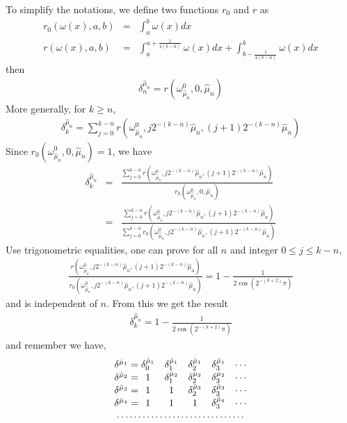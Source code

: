\documentclass{article}
\begin{document}
To simplify the notations, we define two functions $r_0$ and $r$ as
\begin{eqnarray}
  r_0(\omega(x),a,b) &=&  \int_a^b \omega(x) dx\\
  r(\omega(x),a,b)   &=&  \int_a^{a+\frac{1}{4(b-a)}} \omega(x) dx + \int_{b-\frac{1}{4(b-a)}}^b \omega(x) dx
\end{eqnarray}
then 
\begin{eqnarray}
  \delta_n^{\hat{\mu}_n} = r(\omega_{\hat{\mu}_n}^0,0,\hat{\mu}_n)
\end{eqnarray}
More generally, for $k \ge n$, 
\begin{eqnarray}
  \delta_k^{\hat{\mu}_n} = \sum_{j=0}^{k-n} r(\omega_{\hat{\mu}_n}^0,j 2^{-(k-n)} \hat{\mu}_n,(j+1) 2^{-(k-n)} \hat{\mu}_n)
\end{eqnarray}
Since $r_0(\omega_{\hat{\mu}_n}^0,0,\hat{\mu}_n)=1$, we have
\begin{eqnarray}
  \delta_k^{\hat{\mu}_n} &=& \frac{\sum_{j=0}^{k-n} r(\omega_{\hat{\mu}_n}^0,j 2^{-(k-n)} \hat{\mu}_n,(j+1) 2^{-(k-n)} \hat{\mu}_n)}
                                {r_0(\omega_{\hat{\mu}_n}^0,0,\hat{\mu}_n)} \nonumber  \\
                         &=& \frac{\sum_{j=0}^{k-n} r(\omega_{\hat{\mu}_n}^0,j 2^{-(k-n)} \hat{\mu}_n,(j+1) 2^{-(k-n)} \hat{\mu}_n)}
                                  {\sum_{j=0}^{k-n} r_0(\omega_{\hat{\mu}_n}^0,j 2^{-(k-n)} \hat{\mu}_n,(j+1) 2^{-(k-n)} \hat{\mu}_n)} 
\end{eqnarray}
Use trigonometric equalities, one can prove for all $n$ and integer $0 \le j \le k-n $,
\begin{eqnarray}
              \frac{r(\omega_{\hat{\mu}_n}^0,j 2^{-(k-n)} \hat{\mu}_n,(j+1) 2^{-(k-n)} \hat{\mu}_n)}
                   {r_0(\omega_{\hat{\mu}_n}^0,j 2^{-(k-n)} \hat{\mu}_n,(j+1) 2^{-(k-n)} \hat{\mu}_n)} =
              1-\frac{1}{2\cos(2^{-(k+2)} \pi)}
\end{eqnarray}
and is independent of $n$. From this we get the result 
\begin{eqnarray}
\label{deltashiftequality}
 \delta_{k}^{\hat{\mu}_{n}} =  1-\frac{1}{2\cos(2^{-(k+2)} \pi)}
\end{eqnarray}
and remember we have,
\begin{eqnarray}
\begin{array}{c@{{}={}}ccccc} 
 \delta^{\hat{\mu}_1} & \delta_{0}^{\hat{\mu}_1} & \delta_{1}^{\hat{\mu}_1} & \delta_{2}^{\hat{\mu}_1}& \delta_{3}^{\hat{\mu}_1}&\cdots   \\
 \delta^{\hat{\mu}_2} & 1                        & \delta_{1}^{\hat{\mu}_2} & \delta_{2}^{\hat{\mu}_2}& \delta_{3}^{\hat{\mu}_2}&\cdots   \\
 \delta^{\hat{\mu}_3} & 1                        & 1                        & \delta_{2}^{\hat{\mu}_3}& \delta_{3}^{\hat{\mu}_3}&\cdots   \\
 \delta^{\hat{\mu}_4} & 1                        & 1                        & 1                       & \delta_{3}^{\hat{\mu}_4}& \cdots  \\
   \multicolumn{6}{c}{\dotfill}
\end{array}
\end{eqnarray}
\end{document}
